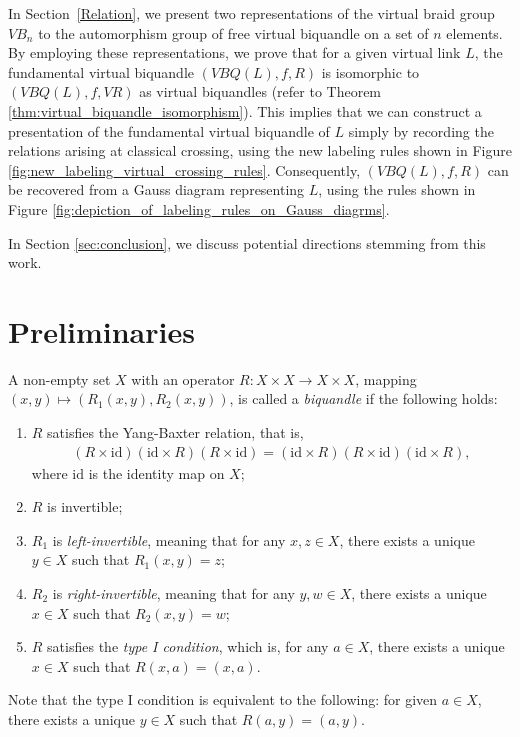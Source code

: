 \documentclass[11pt, reqno]{amsart}
\theoremstyle{definition}
\newcommand{\id}{\mathrm{id}}
\begin{document}
In Section~\ref{Relation}, we present two representations of the virtual braid group $VB_n$ to the automorphism group of free virtual biquandle on a set of $n$ elements. By employing  these representations, we prove that for a given virtual link $L$, the fundamental virtual biquandle $(VBQ(L), f, R)$ is isomorphic to $(VBQ(L), f, VR)$ as virtual biquandles (refer to Theorem \ref{thm:virtual_biquandle_isomorphism}). This implies that we can construct a presentation of the fundamental virtual biquandle of $L$ simply by recording the relations arising at classical crossing, using the new labeling rules shown in Figure \ref{fig:new_labeling_virtual_crossing_rules}. Consequently, $(VBQ(L), f, R)$ can be recovered from a Gauss diagram representing $L$, using the rules shown in Figure \ref{fig:depiction_of_labeling_rules_on_Gauss_diagrms}.

In Section \ref{sec:conclusion}, we discuss potential directions stemming from this work.



\section{Preliminaries}\label{pre}
A non-empty set $X$ with an operator $R\colon X \times X \to X \times X$, mapping $(x,y) \mapsto (R_1(x,y), R_2(x,y) )$, is called a {\it biquandle} if the following holds:
\begin{enumerate}
\item $R$ satisfies the Yang-Baxter relation, that is,
\begin{align}
(R \times \id) (\id \times R) (R \times \id)=(\id \times R) (R \times \id) (\id \times R),\label{eq:YBE}
\end{align}
where $\id$ is the identity map on $X$;
\item $R$ is invertible;
\item $R_1$ is {\it left-invertible}, meaning that for any $x,z \in X$, there exists a unique $y \in X$ such that $R_1(x,y)=z$;
\item $R_2$ is {\it right-invertible}, meaning that for any $y, w \in X$, there exists a unique $x \in X$ such that $R_2(x,y)=w$;
\item $R$ satisfies the {\it type I condition}, which is, for any $a \in X$, there exists a unique $x \in X$ such that $R(x,a)=(x,a)$.
\end{enumerate}


Note that the type I condition is equivalent to the following: for given $a \in X$, there exists a unique $y \in X$ such that $R(a, y)=(a,y)$.
\end{document}
